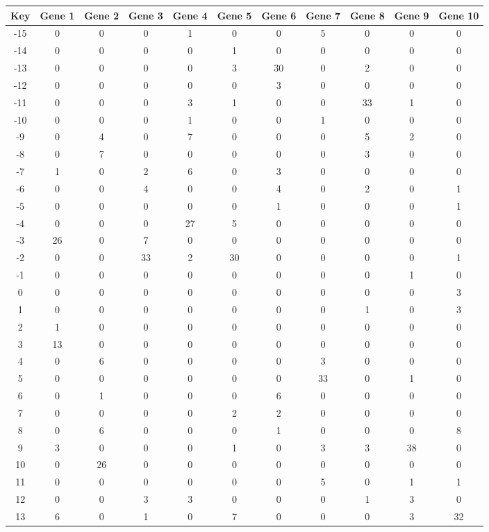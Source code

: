 \begin{tabular}{|c|c|c|c|c|c|c|c|c|c|c|}
\hline
Key & Gene 1 & Gene 2 & Gene 3 & Gene 4 & Gene 5 & Gene 6 & Gene 7 & Gene 8 & Gene 9 & Gene 10 \\
\hline
-15 & 0 & 0 & 0 & 1 & 0 & 0 & 5 & 0 & 0 & 0 \\
-14 & 0 & 0 & 0 & 0 & 1 & 0 & 0 & 0 & 0 & 0 \\
-13 & 0 & 0 & 0 & 0 & 3 & 30 & 0 & 2 & 0 & 0 \\
-12 & 0 & 0 & 0 & 0 & 0 & 3 & 0 & 0 & 0 & 0 \\
-11 & 0 & 0 & 0 & 3 & 1 & 0 & 0 & 33 & 1 & 0 \\
-10 & 0 & 0 & 0 & 1 & 0 & 0 & 1 & 0 & 0 & 0 \\
-9 & 0 & 4 & 0 & 7 & 0 & 0 & 0 & 5 & 2 & 0 \\
-8 & 0 & 7 & 0 & 0 & 0 & 0 & 0 & 3 & 0 & 0 \\
-7 & 1 & 0 & 2 & 6 & 0 & 3 & 0 & 0 & 0 & 0 \\
-6 & 0 & 0 & 4 & 0 & 0 & 4 & 0 & 2 & 0 & 1 \\
-5 & 0 & 0 & 0 & 0 & 0 & 1 & 0 & 0 & 0 & 1 \\
-4 & 0 & 0 & 0 & 27 & 5 & 0 & 0 & 0 & 0 & 0 \\
-3 & 26 & 0 & 7 & 0 & 0 & 0 & 0 & 0 & 0 & 0 \\
-2 & 0 & 0 & 33 & 2 & 30 & 0 & 0 & 0 & 0 & 1 \\
-1 & 0 & 0 & 0 & 0 & 0 & 0 & 0 & 0 & 1 & 0 \\
0 & 0 & 0 & 0 & 0 & 0 & 0 & 0 & 0 & 0 & 3 \\
1 & 0 & 0 & 0 & 0 & 0 & 0 & 0 & 1 & 0 & 3 \\
2 & 1 & 0 & 0 & 0 & 0 & 0 & 0 & 0 & 0 & 0 \\
3 & 13 & 0 & 0 & 0 & 0 & 0 & 0 & 0 & 0 & 0 \\
4 & 0 & 6 & 0 & 0 & 0 & 0 & 3 & 0 & 0 & 0 \\
5 & 0 & 0 & 0 & 0 & 0 & 0 & 33 & 0 & 1 & 0 \\
6 & 0 & 1 & 0 & 0 & 0 & 6 & 0 & 0 & 0 & 0 \\
7 & 0 & 0 & 0 & 0 & 2 & 2 & 0 & 0 & 0 & 0 \\
8 & 0 & 6 & 0 & 0 & 0 & 1 & 0 & 0 & 0 & 8 \\
9 & 3 & 0 & 0 & 0 & 1 & 0 & 3 & 3 & 38 & 0 \\
10 & 0 & 26 & 0 & 0 & 0 & 0 & 0 & 0 & 0 & 0 \\
11 & 0 & 0 & 0 & 0 & 0 & 0 & 5 & 0 & 1 & 1 \\
12 & 0 & 0 & 3 & 3 & 0 & 0 & 0 & 1 & 3 & 0 \\
13 & 6 & 0 & 1 & 0 & 7 & 0 & 0 & 0 & 3 & 32 \\
\hline
\end{tabular}